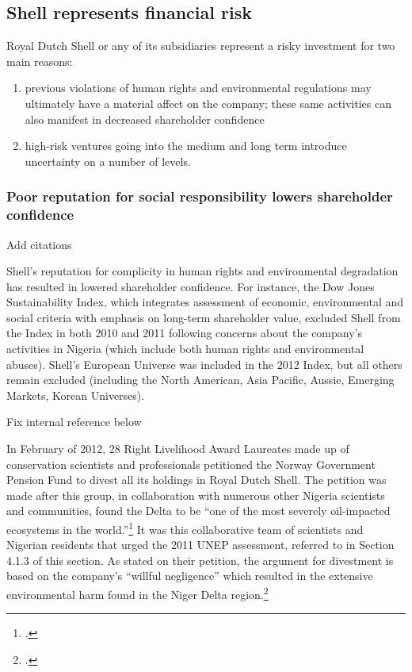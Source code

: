 	\subsection{Shell represents financial risk}
	


Royal Dutch Shell or any of its subsidiaries represent a risky investment for two main reasons:
\begin{enumerate}
	\item previous violations of human rights and environmental regulations may ultimately have a material affect on the company; these same activities can also manifest in decreased shareholder confidence
	\item high-risk ventures going into the medium and long term introduce uncertainty on a number of levels.
\end{enumerate}

	
	
	\subsubsection{Poor reputation for social responsibility lowers shareholder confidence}
	
\begin{vcom}
	Add citations
\end{vcom}
	
Shell's reputation for complicity in human rights and environmental degradation has resulted in lowered shareholder confidence. 
For instance, the Dow Jones Sustainability Index, which integrates assessment of economic, environmental and social criteria with emphasis on long-term shareholder value, excluded Shell from the Index in both 2010 and 2011 following concerns about the company's activities in Nigeria (which include both human rights and environmental abuses). 
Shell's European Universe was included in the 2012 Index, but all others remain excluded (including the North American, Asia Pacific, Aussie, Emerging Markets, Korean Universes).

\begin{vcom}
	Fix internal reference below
\end{vcom}

In February of 2012, 28 Right Livelihood Award Laureates made up of conservation scientists and professionals petitioned the Norway Government Pension Fund to divest all its holdings in Royal Dutch Shell. 
The petition was made after this group, in collaboration with numerous other Nigeria scientists and communities, found the Delta to be ``one of the most severely oil-impacted ecosystems in the world.''\footcite[][]{NigerDeltaReport_2006}
It was this collaborative team of scientists and Nigerian residents that urged the 2011 UNEP assessment, referred to in Section 4.1.3 of this section. 
As stated on their petition, the argument for divestment is based on the company's ``willful negligence'' which resulted in the extensive environmental harm found in the Niger Delta region.\footcite[][]{NorwayPetition_2012}



